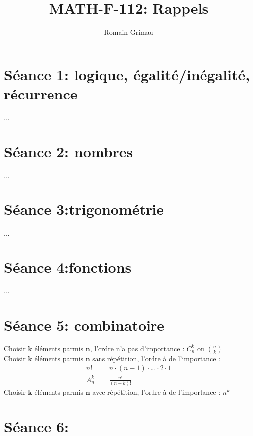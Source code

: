 \documentclass[12pt]{article}
\title{\textbf{MATH-F-112: Rappels}}
\author{Romain Grimau}
\date{}
\begin{document}
\maketitle

\section*{S\'eance 1: logique, \'egalit\'e/in\'egalit\'e, r\'ecurrence}
...
\section*{S\'eance 2: nombres}
...
\section*{S\'eance 3:trigonom\'etrie}
...
\section*{S\'eance 4:fonctions}
...
\section*{S\'eance 5: combinatoire}
Choisir $\textbf{k}$ \'el\'ements parmis $\textbf{n}$, l'ordre n'a pas d'importance : \(C_n^k\) ou \(\binom{n}{k}\) \\ \newline
\indent Choisir $\textbf{k}$ \'el\'ements parmis $\textbf{n}$ sans r\'ep\'etition, l'ordre \`a de l'importance :
\begin{align*}
    n! & =  n\cdot(n-1)\cdot ... \cdot2\cdot1 \\
    A_n^k & =  \frac{n!}{(n-k)!}
\end{align*}
\indent Choisir $\textbf{k}$ \'el\'ements parmis $\textbf{n}$ avec r\'ep\'etition, l'ordre \`a de l'importance : \(n^k\)
\section*{S\'eance 6:}
\end{document}
